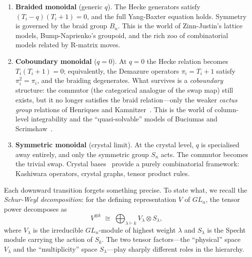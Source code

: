 \begin{enumerate}
\item \textbf{Braided monoidal} (generic $q$).  The Hecke generators satisfy
  $(T_i - q)(T_i + 1) = 0$, and the full Yang-Baxter equation holds.
  Symmetry is governed by the braid group $B_n$.  This is the world of
  Zinn-Justin's lattice models, Bump-Naprienko's groupoid, and the rich zoo
  of combinatorial models related by R-matrix moves.

\item \textbf{Coboundary monoidal} ($q = 0$).  At $q = 0$ the Hecke relation
  becomes $T_i(T_i + 1) = 0$; equivalently, the Demazure operators
  $\pi_i = T_i + 1$ satisfy $\pi_i^2 = \pi_i$, and the braiding
  degenerates.  What survives is a \emph{coboundary} structure: the commutor
  (the categorical analogue of the swap map) still exists, but it no longer
  satisfies the braid relation---only the weaker \emph{cactus group} relations
  of Henriques and Kamnitzer~\cite{henriques-kamnitzer-2006}.  This is the
  world of column-level integrability and the ``quasi-solvable'' models of
  Buciumas and Scrimshaw~\cite{buciumas-scrimshaw}.

\item \textbf{Symmetric monoidal} (crystal limit).  At the crystal level,
  $q$ is specialised away entirely, and only the symmetric group $S_n$ acts.
  The commutor becomes the trivial swap.  Crystal bases~\cite{kashiwara-1990}
  provide a purely combinatorial framework: Kashiwara operators, crystal graphs,
  tensor product rules.
\end{enumerate}

Each downward transition forgets something precise.  To state what, we recall
the \emph{Schur-Weyl decomposition}: for the defining representation $V$ of
$GL_n$, the tensor power decomposes as
\begin{equation}\label{eq:schur-weyl}
  V^{\otimes k} \;\cong\; \bigoplus_{\lambda \vdash k} V_\lambda \otimes S_\lambda,
\end{equation}
where $V_\lambda$ is the irreducible $GL_n$-module of highest weight $\lambda$
and $S_\lambda$ is the Specht module carrying the action of $S_k$.  The two
tensor factors---the ``physical'' space $V_\lambda$ and the ``multiplicity''
space $S_\lambda$---play sharply different roles in the hierarchy.

